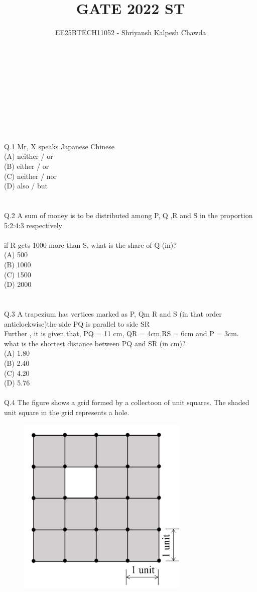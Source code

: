 \documentclass{book}[200pt]
\title{\textbf{GATE 2022 ST}}
\author{ EE25BTECH11052 - Shriyansh Kalpesh Chawda}
\begin{document}
	\maketitle
	\newpage
	\\
	\\
	\\
	\\
	\\
	\\
	\\
	{\Large Q.1 Mr, X speaks \underline{\hspace{2cm}} Japanese \underline{\hspace{2cm}} Chinese \\
	 (A) neither / or \\
	 (B) either / or \\
	 (C) neither / nor \\ 
	 (D) also / but \\
	 \\
	 \\
	 Q.2 A sum of money is to be distributed among P, Q ,R and S in the proportion 5:2:4:3 respectively \\
	 \\ 
	 if R gets 1000 more than S, what is the share of Q (in)? \\
	 (A) 500 \\
	 (B) 1000 \\
	 (C) 1500 \\
	 (D) 2000 \\
	 \\
	 \\
	 Q.3 A trapezium has vertices marked as P, Qm R and S (in that order anticlockwise)the side PQ is parallel to side SR  \\
	 Further , it is given that, PQ = 11 cm, QR = 4cm,RS = 6cm and P = 3cm.\\
	 what is the shortest distance between PQ and SR (in cm)? \\
	 (A) 1.80\\
	 (B) 2.40\\
	 (C) 4.20\\
	 (D) 5.76\\
	 \\
	 Q.4 The figure shows a grid formed by a collectoon of unit squares. The shaded unit square in the grid represents a hole.\\
	 \begin{figure}[H]
	 	\centering
	 	\noindent
	 	\includegraphics[width=0.2\linewidth]{screenshot001}

\end{figure}}
\end{document}
